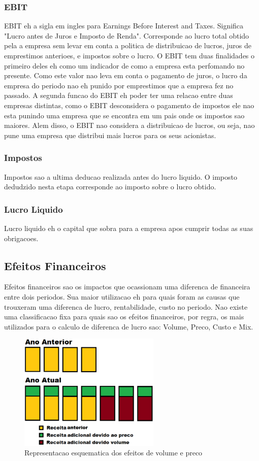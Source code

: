 \documentclass[12pt]{article}
\begin{document}
\subsubsection{EBIT}
EBIT eh a sigla em ingles para Earnings Before Interest and Taxes. Significa "Lucro antes de Juros e Imposto de Renda". Corresponde ao lucro total obtido pela a empresa sem levar em conta a politica de distribuicao de lucros, juros de emprestimos anterioes, e impostos sobre o lucro. O EBIT tem duas finalidades o primeiro deles eh como um indicador de como a empresa esta perfomando no presente. Como este valor nao leva em conta o pagamento de juros, o lucro da empresa do periodo nao eh punido por emprestimos que a empresa fez no passado. A segunda funcao do EBIT eh poder ter uma relacao entre duas empresas distintas, como o EBIT desconsidera o pagamento de impostos ele nao esta punindo uma empresa que se encontra em um pais onde os impostos sao maiores. Alem disso, o EBIT nao considera a distribuicao de lucros, ou seja, nao pune uma empresa que distribui mais lucros para os seus acionistas.

\subsubsection{Impostos}
Impostos sao a ultima deducao realizada antes do lucro liquido. O imposto dedudzido nesta etapa corresponde ao imposto sobre o lucro obtido.

\subsubsection{Lucro Liquido}
Lucro liquido eh o capital que sobra para a empresa apos cumprir todas as suas obrigacoes.


\subsection{Efeitos Financeiros}
Efeitos financeiros sao os impactos que ocassionam uma diferenca de financeira entre dois periodos. Sua maior utilizacao eh para quais foram as causas que trouxeram uma diferenca de lucro, rentabilidade, custo no periodo. Nao existe uma classificacao fixa para quais sao os efeitos financeiros, por regra, os mais utilizados para o calculo de diferenca de lucro sao: Volume, Preco, Custo e Mix.

\begin{figure}[h!]
	\centering
	\includegraphics[width=0.6\textwidth]{img/effects.png}
	\caption{Representacao esquematica dos efeitos de volume e preco}
	\label{fig:effects}
\end{figure}
\end{document}
